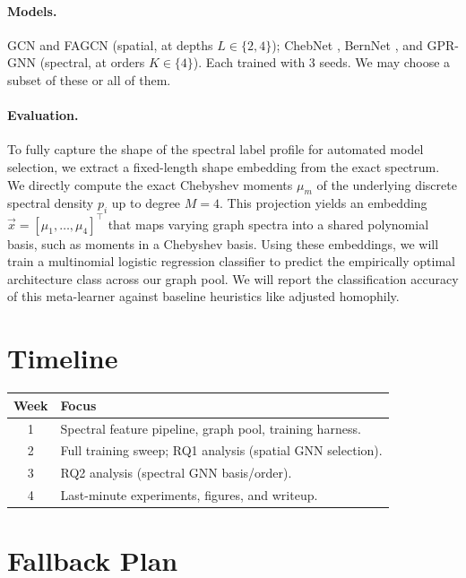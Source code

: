 \documentclass[11pt]{article}
\begin{document}
\paragraph{Models.}
GCN \citep{kipf2017gcn} and FAGCN \citep{bo2021fagcn} (spatial, at depths $L \in \{2,4\}$); ChebNet \citep{defferrard2016chebnet}, BernNet \citep{he2021bernnet},
and GPR-GNN \citep{chien2021gprgnn} (spectral, at orders $K \in \{4\}$).
Each trained with 3 seeds. We may choose a subset of these or all of them.

\paragraph{Evaluation.}
To fully capture the shape of the spectral label profile for automated model selection, we extract a fixed-length shape embedding from the exact spectrum. We directly compute the exact Chebyshev moments $\mu_m$ of the underlying discrete spectral density $p_i$ up to degree $M=4$. This projection yields an embedding $\vec{x} = [\mu_1, \dots, \mu_4]^\top$ that maps varying graph spectra into a shared polynomial basis, such as moments in a Chebyshev basis. Using these embeddings, we will train a multinomial logistic regression classifier to predict the empirically optimal architecture class across our graph pool. We will report the classification accuracy of this meta-learner against baseline heuristics like adjusted homophily.

\section{Timeline}

\begin{center}
\begin{tabular}{@{}cl@{}}
  \toprule
  \textbf{Week} & \textbf{Focus} \\
  \midrule
  1 & Spectral feature pipeline, graph pool, training harness. \\
  2 & Full training sweep; RQ1 analysis (spatial GNN selection). \\
  3 & RQ2 analysis (spectral GNN basis/order). \\
  4 & Last-minute experiments, figures, and writeup. \\
  \bottomrule
\end{tabular}
\end{center}

\section{Fallback Plan}
\end{document}
